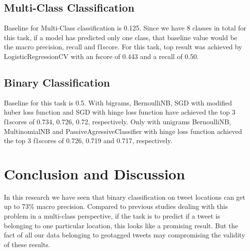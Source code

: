 \documentclass[twoside,11pt]{article}
\begin{document}
\subsection{Multi-Class Classification}
Baseline for Multi-Class classification is 0.125. Since we have 8 classes in total for this task, if a model has predicted only one class, that baseline value would be the macro precision, recall and f1score. 
For this task, top result was achieved by LogisticRegressionCV with an fscore of 0.443 and a recall of 0.50.

\subsection{Binary Classification}
Baseline for this task is 0.5. With bigrams, BernoulliNB, SGD with modified huber loss function and SGD with hinge loss function have achieved the top 3 f1scores of 0.734, 0.726, 0.72, respectively. 
Only with unigrams BernoulliNB, MultinomialNB and PassiveAgressiveClassifier with hinge loss function achieved the top 3 f1scores of 0.726, 0.719 and 0.717, respectively. 


\section{Conclusion and Discussion}
In this research we have seen that binary classification on tweet locations can get up to 73\% macro precision. Compared to previous studies dealing with this problem in a multi-class perspective, if the task is to predict if a tweet is belonging to one particular location, this looks like a promising result. But the fact of all our data belonging to geotagged tweets may compromising the validity of these results.
\end{document}
